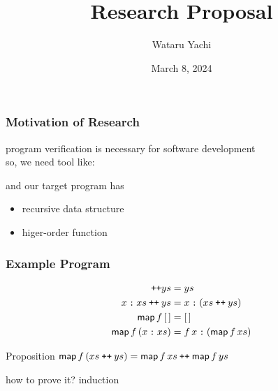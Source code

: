 \documentclass[12pt,aspectratio=169]{beamer}
\title{ Research Proposal }
\author{Wataru Yachi}
\institute{JAIST}
\date{March 8, 2024}
\newcommand{\m}[1]{\mathsf{#1}}
\newcommand\catenate{\mathbin{\text{\ttfamily\upshape ++}}}
\newcommand\cons{\mathbin{\text{\ttfamily\upshape :}}}
\begin{document}
\maketitle

\begin{frame}
    \frametitle{Motivation of Research}
    program verification is necessary for software development\\
    so, we need tool like:
    \begin{figure}
        \centering
    \end{figure}
    and our target program has
    \begin{itemize}
        \item recursive data structure
        \item higer-order function
    \end{itemize}
\end{frame}

\newcommand{\map}{\m{map}}
\newcommand{\nil}{[\,]}

\begin{frame}
    \frametitle{Example Program}
    \begin{example}
            \setlength{\abovedisplayskip}{0pt}
            \setlength{\belowdisplayskip}{0pt}
        \begin{align*}
            \nil \catenate ys &= ys\\
            x\cons xs \catenate ys &= x \cons (xs \catenate ys)\\
            \map\,f\,\nil &= \nil\\
            \map\,f\,(x\cons xs) &= f\,x \cons (\map\,f\,xs)\\
        \end{align*}
        \vspace{-20pt}
    \begin{block}{Proposition}
        $\m{map}\,f\,(xs \catenate ys) = \m{map} \, f \, xs \catenate \m{map}\,f\,ys$
    \end{block}
        how to prove it? \quad \alert{induction}
    \end{example}
\end{frame}
\end{document}
